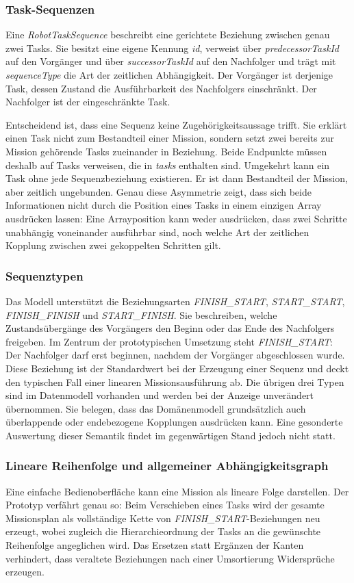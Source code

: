 \subsubsection{Task-Sequenzen}
Eine \textit{RobotTaskSequence} beschreibt eine gerichtete Beziehung zwischen genau zwei Tasks. Sie
besitzt eine eigene Kennung \textit{id}, verweist über \textit{predecessorTaskId} auf den Vorgänger
und über \textit{successorTaskId} auf den Nachfolger und trägt mit \textit{sequenceType} die Art der
zeitlichen Abhängigkeit. Der Vorgänger ist derjenige Task, dessen Zustand die Ausführbarkeit des
Nachfolgers einschränkt. Der Nachfolger ist der eingeschränkte Task.

Entscheidend ist, dass eine Sequenz keine Zugehörigkeitsaussage trifft. Sie erklärt einen Task nicht
zum Bestandteil einer Mission, sondern setzt zwei bereits zur Mission gehörende Tasks zueinander in
Beziehung. Beide Endpunkte müssen deshalb auf Tasks verweisen, die in \textit{tasks} enthalten sind.
Umgekehrt kann ein Task ohne jede Sequenzbeziehung existieren. Er ist dann Bestandteil der Mission,
aber zeitlich ungebunden. Genau diese Asymmetrie zeigt, dass sich beide Informationen nicht durch
die Position eines Tasks in einem einzigen Array ausdrücken lassen: Eine Arrayposition kann weder
ausdrücken, dass zwei Schritte unabhängig voneinander ausführbar sind, noch welche Art der
zeitlichen Kopplung zwischen zwei gekoppelten Schritten gilt.

\subsubsection{Sequenztypen}
Das Modell unterstützt die Beziehungsarten \textit{FINISH\_START}, \textit{START\_START},
\textit{FINISH\_FINISH} und \textit{START\_FINISH}. Sie beschreiben, welche Zustandsübergänge des
Vorgängers den Beginn oder das Ende des Nachfolgers freigeben. Im Zentrum der prototypischen
Umsetzung steht \textit{FINISH\_START}: Der Nachfolger darf erst beginnen, nachdem der Vorgänger
abgeschlossen wurde. Diese Beziehung ist der Standardwert bei der Erzeugung einer Sequenz und deckt
den typischen Fall einer linearen Missionsausführung ab.
Die übrigen drei Typen sind im Datenmodell vorhanden und werden bei der Anzeige unverändert
übernommen. Sie belegen, dass das Domänenmodell grundsätzlich auch überlappende oder endebezogene
Kopplungen ausdrücken kann. Eine gesonderte Auswertung dieser Semantik findet im gegenwärtigen Stand
jedoch nicht statt.

\subsubsection{Lineare Reihenfolge und allgemeiner Abhängigkeitsgraph}
Eine einfache Bedienoberfläche kann eine Mission als lineare Folge darstellen. Der Prototyp verfährt
genau so: Beim Verschieben eines Tasks wird der gesamte Missionsplan als vollständige Kette von
\textit{FINISH\_START}-Beziehungen neu erzeugt, wobei zugleich die Hierarchieordnung der Tasks an
die gewünschte Reihenfolge angeglichen wird. Das Ersetzen statt Ergänzen der Kanten verhindert, dass
veraltete Beziehungen nach einer Umsortierung Widersprüche erzeugen.

